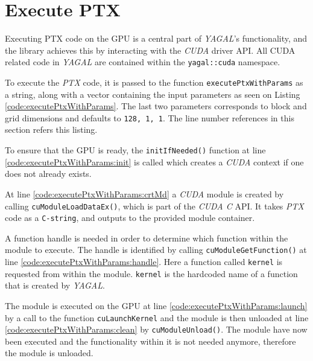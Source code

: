\section{Execute PTX} \label{cha:execPtx}
Executing PTX code on the GPU is a central part of \textit{YAGAL}'s functionality, and the library achieves this by interacting with the \textit{CUDA} driver API. All CUDA related code in \textit{YAGAL} are contained within the \texttt{yagal::cuda} namespace.

To execute the \textit{PTX} code, it is passed to the function \texttt{executePtxWithParams} as a string, along with a vector containing the input parameters as seen on Listing \ref{code:executePtxWithParams}. The last two parameters corresponds to block and grid dimensions and defaults to \texttt{128, 1, 1}. The line number references in this section refers this listing.

To ensure that the GPU is ready, the \texttt{initIfNeeded()} function at line \ref{code:executePtxWithParams:init} is called which creates a \textit{CUDA} context if one does not already exists.

At line \ref{code:executePtxWithParams:crtMd} a \textit{CUDA} module is created by calling \texttt{cuModuleLoadDataEx()}, which is part of the \textit{CUDA C} API. It takes \textit{PTX} code as a \texttt{C-string}, and outputs to the provided module container.

A function handle is needed in order to determine which function within the module to execute. The handle is identified by calling \texttt{cuModuleGetFunction()} at line \ref{code:executePtxWithParams:handle}. Here a function called \texttt{kernel} is requested from within the module. \texttt{kernel} is the hardcoded name of a function that is created by \textit{YAGAL}.

The module is executed on the GPU at line \ref{code:executePtxWithParams:launch} by a call to the function \texttt{cuLaunchKernel} and the module is then unloaded at line \ref{code:executePtxWithParams:clean} by \texttt{cuModuleUnload()}. The module have now been executed and the functionality within it is not needed anymore, therefore the module is unloaded.

